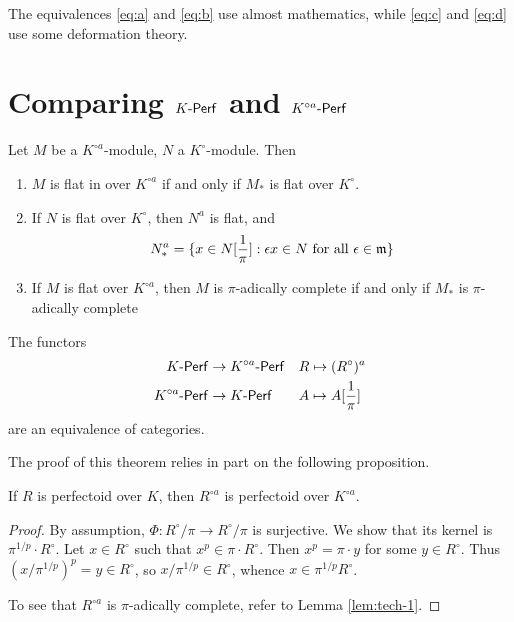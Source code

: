\documentclass{article}
\begin{document}
The equivalences \eqref{eq:a} and \eqref{eq:b} use almost mathematics, while 
\eqref{eq:c} and \eqref{eq:d} use some deformation theory. 





\section{Comparing $K\textnormal{-}\mathsf{Perf}$ and $K^{\circ a}\textnormal{-}\mathsf{Perf}$} 

\begin{lemma}\label{lem:tech-1}
Let $M$ be a $K^{\circ a}$-module, $N$ a $K^\circ$-module. Then 
\begin{enumerate}
  \item $M$ is flat in over $K^{\circ a}$ if and only if $M_\ast$ is flat over $K^\circ$. 
  \item If $N$ is flat over $K^\circ$, then $N^a$ is flat, and 
    \[
      N_\ast^a = \{x\in N[\frac 1 \pi] : \epsilon x\in N\text{ for all }\epsilon\in\mathfrak{m}\} 
    \]
  \item If $M$ is flat over $K^{\circ a}$, then $M$ is $\pi$-adically complete if 
    and only if $M_\ast$ is $\pi$-adically complete
\end{enumerate}
\end{lemma}

\begin{theorem}
The functors 
\begin{align*}
  K\textnormal{-}\mathsf{Perf} &\to K^{\circ a}\textnormal{-}\mathsf{Perf} && R\mapsto (R^\circ)^a \\
  K^{\circ a}\textnormal{-}\mathsf{Perf} &\to K\textnormal{-}\mathsf{Perf} && A\mapsto A[\frac 1 \pi] 
\end{align*}
are an equivalence of categories. 
\end{theorem}

The proof of this theorem relies in part on the following proposition. 
\begin{proposition}
If $R$ is perfectoid over $K$, then $R^{\circ a}$ is perfectoid over $K^{\circ a}$. 
\end{proposition}
\begin{proof}
By assumption, $\Phi:R^\circ/\pi \to R^\circ/\pi$ is surjective. We show that 
its kernel is $\pi^{1/p}\cdot R^\circ$. Let 
$x\in R^\circ$ such that $x^p\in \pi\cdot R^\circ$. Then $x^p=\pi\cdot y$ for some 
$y\in R^\circ$. Thus $(x/\pi^{1/p})^p = y\in R^\circ$, so 
$x/\pi^{1/p}\in R^\circ$, whence 
$x\in \pi^{1/p} R^\circ$. 

To see that $R^{\circ a}$ is $\pi$-adically complete, refer to Lemma \ref{lem:tech-1}. 
\end{proof}
\end{document}

